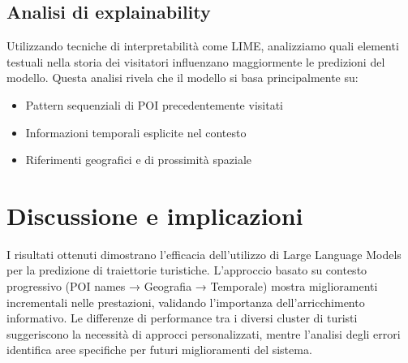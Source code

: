 \subsection{Analisi di explainability}

Utilizzando tecniche di interpretabilità come LIME, analizziamo quali elementi testuali nella storia dei visitatori influenzano maggiormente le predizioni del modello. Questa analisi rivela che il modello si basa principalmente su:
\begin{itemize}
\item Pattern sequenziali di POI precedentemente visitati
\item Informazioni temporali esplicite nel contesto
\item Riferimenti geografici e di prossimità spaziale
\end{itemize}

\section{Discussione e implicazioni}

I risultati ottenuti dimostrano l'efficacia dell'utilizzo di Large Language Models per la predizione di traiettorie turistiche. L'approccio basato su contesto progressivo (POI names → Geografia → Temporale) mostra miglioramenti incrementali nelle prestazioni, validando l'importanza dell'arricchimento informativo.
Le differenze di performance tra i diversi cluster di turisti suggeriscono la necessità di approcci personalizzati, mentre l'analisi degli errori identifica aree specifiche per futuri miglioramenti del sistema.